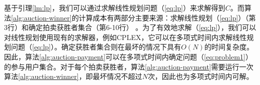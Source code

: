 	基于引理\ref{lm:lp}，我们可以通过求解线性规划问题（\ref{eq:lp}）来求解得到$C$。而算法\ref{alg:auction-winner}的计算成本有两部分主要来源：求解线性规划（\ref{eq:lp}）（第3行）和确定拍卖获胜者集合（第6-10行） 。为了有效地求解（\ref{eq:lp}），我们可以对线性规划使用现有的求解器，例如CPLEX\cite{CPLEX}，它可以在多项式时间内求解线性规划问题（\ref{eq:lp}）\cite{megiddo1986complexity}。确定获胜者集合则在最坏的情况下具有$O(N)$的时间复杂度。因此，算法\ref{alg:auction-payment}可以在多项式时间内确定问题（\ref{eq:problem1}）的参与用户集合。对于每个拍卖获胜者，算法\ref{alg:auction-payment}需要运行一次算法\ref{alg:auction-winner}，即最坏情况不超过$N$次，因此也为多项式时间内可解。
	
	

	
	
